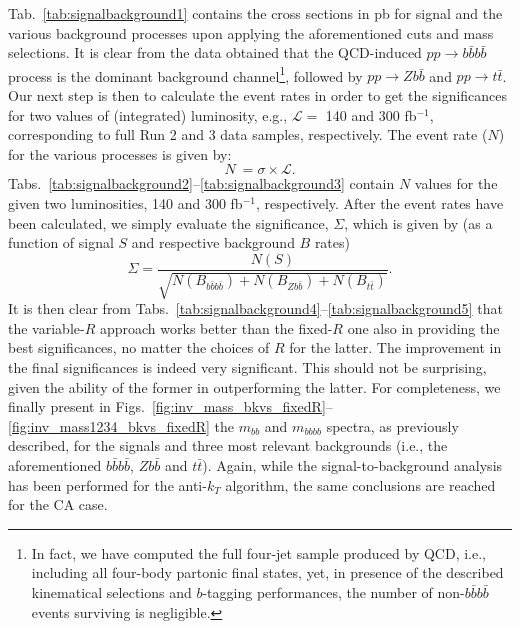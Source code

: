 \documentclass[12pt]{article}
\begin{document}
Tab.~\ref{tab:signalbackground1} contains the cross sections in pb for signal and the various background processes upon applying the aforementioned cuts and mass selections. It is clear from the data obtained that the QCD-induced $pp \rightarrow b\bar{b}b\bar{b}$ process  is the dominant background channel\footnote{In fact, we have computed the full four-jet sample produced by QCD, i.e., including all four-body partonic final states, yet, in presence of the described kinematical selections and $b$-tagging performances, the number of non-$b\bar bb\bar b$ events surviving is negligible.}, followed by
$pp\to Zb\bar b$ and $pp\to t\bar t$. Our next step is then to calculate the event rates in order to get the significances for two values of (integrated)  luminosity, e.g.,  ${\mathcal{L}}=$  140 and 300 fb$^{-1}$, corresponding to full Run 2 and 3 data samples, respectively. The event rate ($N$) for the various processes is given by:
%
\begin{equation}
N \ = \sigma \times \mathcal{L}.
\end{equation}
%
Tabs.~\ref{tab:signalbackground2}--\ref{tab:signalbackground3} contain $N$ values for the given two luminosities, 140 and 300 fb$^{-1}$,  respectively. After the event rates have been calculated, we simply evaluate the significance, $\Sigma$, which is given by (as a function of signal $S$ and respective background $B$ rates)
%
\begin{equation}
\Sigma = \frac{N(S)}{\sqrt{N(B_{b\bar{b}b\bar{b}})+N(B_{Zb\bar{b}})+N(B_{t\bar{t}})}}.
\end{equation}
%
It is then clear from Tabs.~\ref{tab:signalbackground4}--\ref{tab:signalbackground5}
that the variable-$R$ approach works better than the fixed-$R$ one also in providing the best significances, no matter the choices of $R$ for the latter.  The improvement in the final significances is indeed very significant.
This should not be surprising, given the ability of the former in outperforming the latter.  For completeness, we finally present in
Figs.~\ref{fig:inv_mass_bkvs_fixedR}--\ref{fig:inv_mass1234_bkvs_fixedR} the $m_{bb}$ and $m_{bbbb}$ spectra, as previously described, for the signals and  three most relevant
backgrounds (i.e., the aforementioned $b\bar bb\bar b$,  $Zb\bar b$ and $t\bar t$). Again, while the signal-to-background analysis has been performed for the
anti-$k_T$ algorithm, the same conclusions are reached for the CA case.
\end{document}
